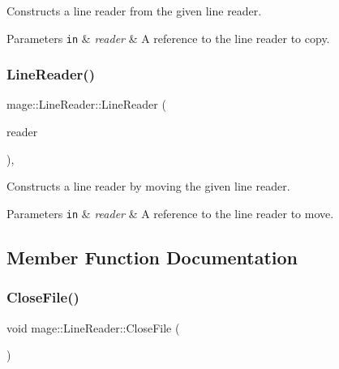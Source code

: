 Constructs a line reader from the given line reader.


\begin{DoxyParams}[1]{Parameters}
\mbox{\tt in}  & {\em reader} & A reference to the line reader to copy. \\
\hline
\end{DoxyParams}
\hypertarget{classmage_1_1_line_reader_a0a9e80aabd15594f3e20bf7265e16c5e}{}\label{classmage_1_1_line_reader_a0a9e80aabd15594f3e20bf7265e16c5e} 
\subsubsection{\texorpdfstring{Line\+Reader()}{LineReader()}\hspace{0.1cm}{\footnotesize\ttfamily [3/3]}}
{\footnotesize\ttfamily mage\+::\+Line\+Reader\+::\+Line\+Reader (\begin{DoxyParamCaption}\item[{\hyperlink{classmage_1_1_line_reader}{Line\+Reader} \&\&}]{reader }\end{DoxyParamCaption})\hspace{0.3cm}{\ttfamily [protected]}, {\ttfamily [default]}}

Constructs a line reader by moving the given line reader.


\begin{DoxyParams}[1]{Parameters}
\mbox{\tt in}  & {\em reader} & A reference to the line reader to move. \\
\hline
\end{DoxyParams}


\subsection{Member Function Documentation}
\hypertarget{classmage_1_1_line_reader_ab2ee825c79432ac1af53eb899fcaeb98}{}\label{classmage_1_1_line_reader_ab2ee825c79432ac1af53eb899fcaeb98} 
\subsubsection{\texorpdfstring{Close\+File()}{CloseFile()}}
{\footnotesize\ttfamily void mage\+::\+Line\+Reader\+::\+Close\+File (\begin{DoxyParamCaption}{ }\end{DoxyParamCaption})\hspace{0.3cm}{\ttfamily [private]}}

